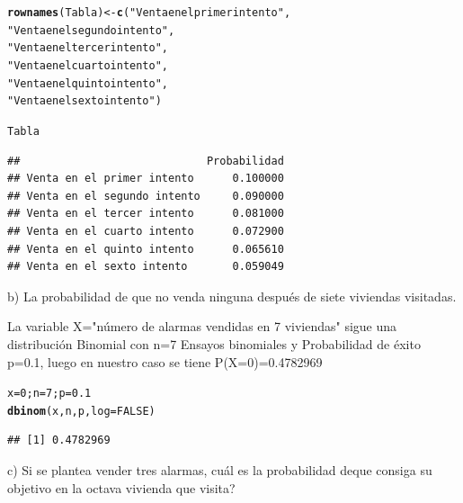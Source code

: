 \documentclass[12pt,letterpaper]{article}\usepackage[]{graphicx}\usepackage[]{color}
\makeatletter
\newcommand{\hlnum}[1]{\textcolor[rgb]{0.686,0.059,0.569}{#1}}%
\newcommand{\hlstr}[1]{\textcolor[rgb]{0.192,0.494,0.8}{#1}}%
\newcommand{\hlstd}[1]{\textcolor[rgb]{0.345,0.345,0.345}{#1}}%
\newcommand{\hlkwb}[1]{\textcolor[rgb]{0.69,0.353,0.396}{#1}}%
\newcommand{\hlkwc}[1]{\textcolor[rgb]{0.333,0.667,0.333}{#1}}%
\newcommand{\hlkwd}[1]{\textcolor[rgb]{0.737,0.353,0.396}{\textbf{#1}}}%
\newenvironment{kframe}{%
 \def\at@end@of@kframe{}%
 \ifinner\ifhmode%
  \def\at@end@of@kframe{\end{minipage}}%
  \begin{minipage}{\columnwidth}%
 \fi\fi%
 \def\FrameCommand##1{\hskip\@totalleftmargin \hskip-\fboxsep
 \colorbox{shadecolor}{##1}\hskip-\fboxsep
     \hskip-\linewidth \hskip-\@totalleftmargin \hskip\columnwidth}%
 \MakeFramed {\advance\hsize-\width
   \@totalleftmargin\z@ \linewidth\hsize
   \@setminipage}}%
 {\par\unskip\endMakeFramed%
 \at@end@of@kframe}
\newenvironment{knitrout}{}{} %
\makeatother
\begin{document}
\begin{itemize}
\begin{knitrout}
\begin{kframe}
\begin{alltt}
\hlkwd{rownames}\hlstd{(Tabla)} \hlkwb{<-} \hlkwd{c}\hlstd{(}\hlstr{"Venta en el primer intento"}\hlstd{,}
                     \hlstr{"Venta en el segundo intento"}\hlstd{,}
                     \hlstr{"Venta en el tercer intento"}\hlstd{,}
                     \hlstr{"Venta en el cuarto intento"}\hlstd{,}
                     \hlstr{"Venta en el quinto intento"}\hlstd{,}
                     \hlstr{"Venta en el sexto intento"}\hlstd{)}

\hlstd{Tabla}
\end{alltt}
\begin{verbatim}
##                             Probabilidad
## Venta en el primer intento      0.100000
## Venta en el segundo intento     0.090000
## Venta en el tercer intento      0.081000
## Venta en el cuarto intento      0.072900
## Venta en el quinto intento      0.065610
## Venta en el sexto intento       0.059049
\end{verbatim}
\end{kframe}
\end{knitrout}

\begin{description}
  \item b) La probabilidad de que no venda ninguna despu\'es de siete viviendas visitadas. 
\end{description}

La variable X="n\'umero de alarmas vendidas en 7 viviendas" sigue una distribuci\'on Binomial con n=7 Ensayos binomiales y Probabilidad de \'exito p=0.1, luego en nuestro caso se tiene P(X=0)=0.4782969

\begin{knitrout}
\color{fgcolor}\begin{kframe}
\begin{alltt}
\hlstd{x}\hlkwb{=}\hlnum{0}\hlstd{; n}\hlkwb{=}\hlnum{7}\hlstd{; p}\hlkwb{=}\hlnum{0.1}
\hlkwd{dbinom}\hlstd{(x, n, p,} \hlkwc{log} \hlstd{=} \hlnum{FALSE}\hlstd{)}
\end{alltt}
\begin{verbatim}
## [1] 0.4782969
\end{verbatim}
\end{kframe}
\end{knitrout}

\begin{description}
  \item c) Si se plantea vender tres alarmas, cu\'al es la probabilidad deque consiga su objetivo en la octava vivienda que visita?  
\end{description}


\end{itemize}
\end{document}
